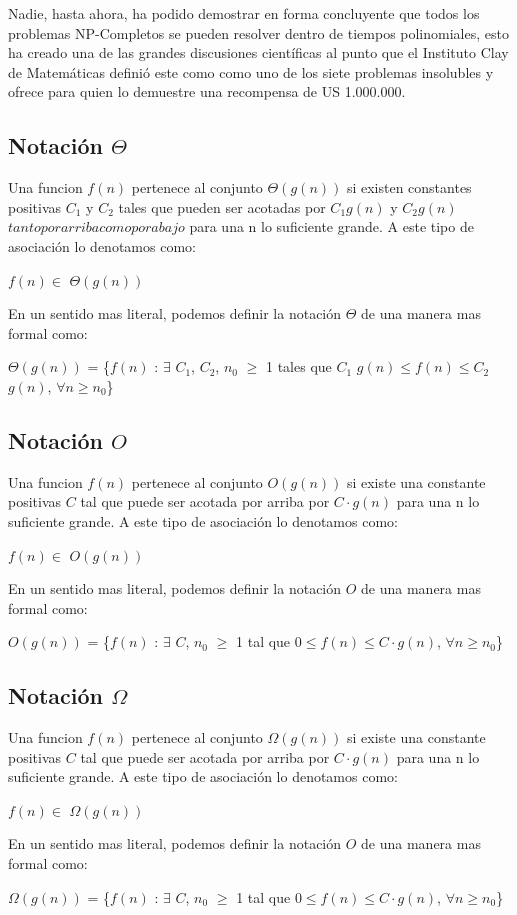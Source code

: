 \documentclass[12pt,twoside]{article}
\begin{document}
Nadie, hasta ahora, ha podido demostrar en forma concluyente que todos los problemas NP-Completos se pueden resolver dentro de 
tiempos polinomiales, esto ha creado una de las grandes discusiones científicas al punto que el Instituto Clay de Matemáticas 
definió este como como uno de los siete problemas insolubles y ofrece para quien lo demuestre una recompensa de US 1.000.000.

\subsection{\textbf{Notaci\'on $\Theta$ }}
Una funcion $f(n)$ pertenece al conjunto $\Theta(g(n))$ si existen constantes positivas $C_{1}$ y $C_{2}$ tales que pueden ser acotadas 
por $C_{1}g(n)$ y $C_{2}g(n)$ \(tanto por arriba como por abajo\) para una n lo suficiente grande. A este tipo de asociaci\'on lo denotamos como:
\begin{center}
  $f(n) \in$ $\Theta (g(n))$
\end{center}
En un sentido mas literal, podemos definir la notaci\'on $\Theta$ de una manera mas formal como:
\begin{center}
  $\Theta(g(n))$ = \{$f(n)$ : $\exists$ $C_{1}$, $C_{2}$, $n_{0}$ $\ge$ 1 tales que $C_{1}$
  $ g(n) \leq f(n) \leq C_{2}$ $g(n)$, $\forall n \ge n_{0}$\}
\end{center}

\subsection{\textbf{Notaci\'on $O$ }}
Una funcion $f(n)$ pertenece al conjunto $O(g(n))$ si existe una constante positivas $C$ tal que puede ser acotada 
por arriba por $C\cdot g(n)$ para una n lo suficiente grande. A este tipo de asociaci\'on lo denotamos como:
\begin{center}
  $f(n) \in$ $O(g(n))$
\end{center}
En un sentido mas literal, podemos definir la notaci\'on $O$ de una manera mas formal como:\\
\begin{center}
  $O(g(n))$ = \{$f(n)$ : $\exists$ $C$, $n_{0}$ $\ge$ 1 tal que 
$ 0 \leq f(n) \leq C \cdot g(n)$, $\forall n \ge n_{0}$\}
\end{center}

\subsection{\textbf{Notaci\'on $\Omega$ }}
Una funcion $f(n)$ pertenece al conjunto $\Omega (g(n))$ si existe una constante positivas $C$ tal que puede ser acotada 
por arriba por $C\cdot g(n)$ para una n lo suficiente grande. A este tipo de asociaci\'on lo denotamos como:
\begin{center}
  $f(n) \in$ $\Omega (g(n))$
\end{center}
En un sentido mas literal, podemos definir la notaci\'on $O$ de una manera mas formal como:
\begin{center}
  $\Omega (g(n))$ = \{$f(n)$ : $\exists$ $C$, $n_{0}$ $\ge$ 1 tal que 
$ 0 \leq f(n) \leq C \cdot g(n)$, $\forall n \ge n_{0}$\}
\end{center}
\end{document}
